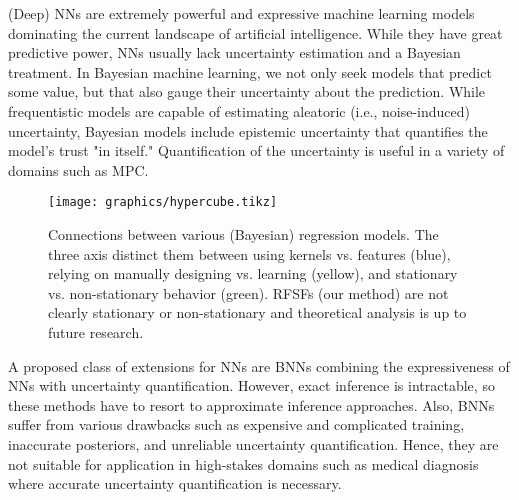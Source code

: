 (Deep) \acp{NN} are extremely powerful and expressive machine learning models dominating the current landscape of artificial intelligence\cite{krizhevskyImageNetClassificationDeep2012}.
While they have great predictive power, \acp{NN} usually lack uncertainty estimation and a Bayesian treatment.
In Bayesian machine learning, we not only seek models that predict some value, but that also gauge their uncertainty about the prediction.
While frequentistic models are capable of estimating aleatoric (i.e., noise-induced) uncertainty, Bayesian models include epistemic uncertainty that quantifies the model's trust "in itself."
Quantification of the uncertainty is useful in a variety of domains such as \ac{MPC}\cite{hewingLearningBasedModelPredictive2020,bradfordStochasticDatadrivenModel2020}.

\begin{figure}
	\centering
	\texttt{[image: graphics/hypercube.tikz]}
	\caption{
		Connections between various (Bayesian) regression models.
		The three axis distinct them between using kernels vs. features (blue), relying on manually designing vs. learning (yellow), and stationary vs. non-stationary behavior (green).
		\acsp{RFSF} (our method) are not clearly stationary or non-stationary and theoretical analysis is up to future research.
	}
	\label{fig:hypercube}
\end{figure}

A proposed class of extensions for \acp{NN} are \acp{BNN}\cite{mackayPracticalBayesianFramework1992,nealBayesianLearningNeural2012} combining the expressiveness of \acp{NN} with uncertainty quantification.
However, exact inference is intractable, so these methods have to resort to approximate inference approaches\cite{nealBayesianLearningNeural2012,hernandez-lobatoProbabilisticBackpropagationScalable2015,denkerTransformingNeuralNetOutput1990,galDropoutBayesianApproximation2016,lakshminarayananSimpleScalablePredictive2017,blundellWeightUncertaintyNeural2015}.
Also, \acp{BNN} suffer from various drawbacks such as expensive and complicated training, inaccurate posteriors, and unreliable uncertainty quantification\cite{foongExpressivenessApproximateInference2020,foongInBetweenUncertaintyBayesian2019,osbandRandomizedPriorFunctions2018,ovadiaCanYouTrust2019,wenzelHowGoodBayes2020,yaoQualityUncertaintyQuantification2019}.
Hence, they are not suitable for application in high-stakes domains such as medical diagnosis where accurate uncertainty quantification is necessary\cite{watsonLatentDerivativeBayesian2021}.

